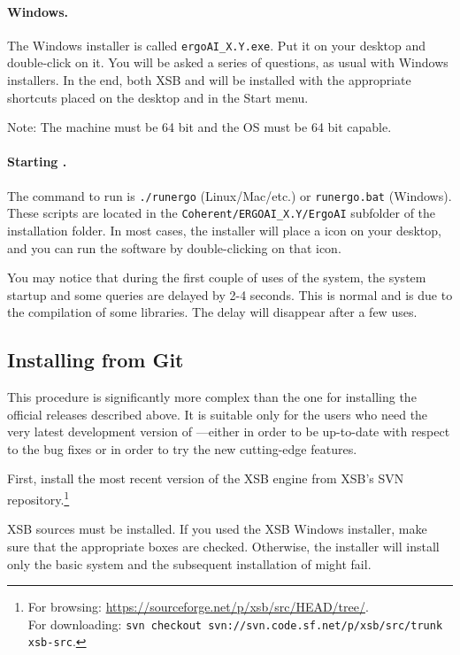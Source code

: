 \documentclass[11pt]{article}
\newcommand{\ERGO}{\mbox{\smaller{\ensuremath{\cal{E}}\smaller{{\sc{RGO}}}}}\xspace}
\newcommand{\FLSYSTEM}{\ERGO}
\newcommand{\ENGINERUN}{runergo}
\begin{document}
{\paragraph{Windows.}
The Windows installer is called \texttt{ergoAI_X.Y.exe}.
Put it on your desktop and double-click on it. You will be asked a series
of questions, as usual with Windows installers. In the end, both XSB and 
\FLSYSTEM will be installed with the appropriate shortcuts placed on the
desktop and in the Start menu.

Note: The machine must be 64 bit and the OS must be 64 bit capable.

\paragraph{Starting \FLSYSTEM.}
The command to run \FLSYSTEM is \texttt{./\ENGINERUN} (Linux/Mac/etc.)
or \texttt{\ENGINERUN.bat} (Windows). These scripts are located in the
\texttt{Coherent/ERGOAI_X.Y/ErgoAI} subfolder of the installation folder. 
In most cases, the installer will place a \FLSYSTEM icon on your desktop,
and you can run  the software by double-clicking on that icon.

You may notice that during the first couple of uses of the
system, the system startup and some queries are delayed by 2-4 seconds.
This is normal and is due to the compilation of some libraries. The delay
will disappear after a few uses.


\subsection{Installing \FLSYSTEM from Git}

This procedure is significantly more complex than the one for installing
the official \FLSYSTEM releases described above. It is suitable only for the
users who need the very latest development version of \FLSYSTEM---either in
order to be up-to-date with respect to the bug fixes or in
order to try the new cutting-edge features.

First, install the most recent version of the XSB engine from
XSB's SVN repository.\footnote{
  For browsing:
  \url{https://sourceforge.net/p/xsb/src/HEAD/tree/}.
  \\
  \hspace*{7mm}For downloading:
  \texttt{svn~checkout~svn://svn.code.sf.net/p/xsb/src/trunk xsb-src}.
  }

XSB sources must be installed.
If you used the XSB Windows installer,
make sure that the appropriate boxes are checked. Otherwise, the installer
will install only the basic system and the subsequent installation of
\FLSYSTEM might fail.

}
\end{document}
